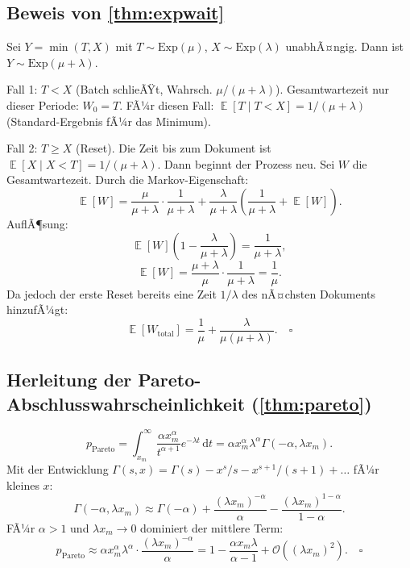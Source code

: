 ﻿\documentclass[12pt, a4paper]{article}
\DeclareMathOperator{\E}{\mathbb{E}}
\newcommand{\Exp}{\mathrm{Exp}}
\newcommand{\Pareto}{\mathrm{Pareto}}
\begin{document}
\subsection{Beweis von \cref{thm:expwait}}

Sei $Y = \min(T, X)$ mit $T \sim \Exp(\mu)$, $X \sim \Exp(\lambda)$ unabhÃ¤ngig.
Dann ist $Y \sim \Exp(\mu + \lambda)$.

Fall 1: $T < X$ (Batch schlieÃŸt, Wahrsch. $\mu/(\mu+\lambda)$). Gesamtwartezeit
nur dieser Periode: $W_0 = T$. FÃ¼r diesen Fall:
$\E[T \mid T < X] = 1/(\mu + \lambda)$ (Standard-Ergebnis fÃ¼r das Minimum).

Fall 2: $T \geq X$ (Reset). Die Zeit bis zum Dokument ist $\E[X \mid X < T]
= 1/(\mu+\lambda)$. Dann beginnt der Prozess neu. Sei $W$ die Gesamtwartezeit.
Durch die Markov-Eigenschaft:
\[
  \E[W] = \frac{\mu}{\mu+\lambda} \cdot \frac{1}{\mu+\lambda}
          + \frac{\lambda}{\mu+\lambda}\left(\frac{1}{\mu+\lambda} + \E[W]\right).
\]
AuflÃ¶sung:
\[
  \E[W]\left(1 - \frac{\lambda}{\mu+\lambda}\right) =
  \frac{1}{\mu+\lambda},
\]
\[
  \E[W] = \frac{\mu+\lambda}{\mu} \cdot \frac{1}{\mu+\lambda} = \frac{1}{\mu}.
\]
Da jedoch der erste Reset bereits eine Zeit $1/\lambda$ des nÃ¤chsten Dokuments
hinzufÃ¼gt:
\[
  \E[W_{\mathrm{total}}] = \frac{1}{\mu} + \frac{\lambda}{\mu(\mu+\lambda)}. \quad \square
\]

\subsection{Herleitung der Pareto-Abschlusswahrscheinlichkeit (\cref{thm:pareto})}

\[
  p_{\Pareto} = \int_{x_m}^\infty \frac{\alpha x_m^\alpha}{t^{\alpha+1}}
  e^{-\lambda t}\,\mathrm{d}t
  = \alpha x_m^\alpha \lambda^\alpha \Gamma(-\alpha, \lambda x_m).
\]
Mit der Entwicklung $\Gamma(s, x) = \Gamma(s) - x^s/s - x^{s+1}/(s+1) + \ldots$
fÃ¼r kleines $x$:
\[
  \Gamma(-\alpha, \lambda x_m) \approx \Gamma(-\alpha) +
  \frac{(\lambda x_m)^{-\alpha}}{\alpha} - \frac{(\lambda x_m)^{1-\alpha}}{1-\alpha}.
\]
FÃ¼r $\alpha > 1$ und $\lambda x_m \to 0$ dominiert der mittlere Term:
\[
  p_{\Pareto} \approx \alpha x_m^\alpha \lambda^\alpha \cdot
  \frac{(\lambda x_m)^{-\alpha}}{\alpha} = 1 - \frac{\alpha x_m \lambda}{\alpha-1}
  + \mathcal{O}((\lambda x_m)^2). \quad \square
\]
\end{document}

